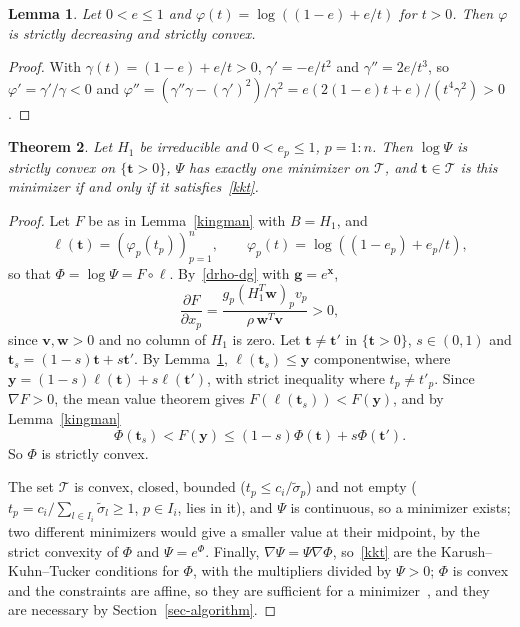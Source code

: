 \documentclass[11pt]{article}
\theoremstyle{plain}
\newtheorem{theorem}{Theorem}[section]
\newtheorem{lemma}[theorem]{Lemma}
\theoremstyle{remark}
\numberwithin{equation}{section}
\begin{document}
\begin{lemma}\label{log-g}
Let $0<e\le 1$ and $\varphi(t)=\log\left((1-e)+e/t\right)$ for $t>0$. Then
$\varphi$ is strictly decreasing and strictly convex.
\end{lemma}
\begin{proof}
With $\gamma(t)=(1-e)+e/t>0$, $\gamma'=-e/t^2$ and $\gamma''=2e/t^3$, so
$\varphi'=\gamma'/\gamma<0$ and
$\varphi''=\left(\gamma''\gamma-(\gamma')^2\right)/\gamma^2
=e\left(2(1-e)t+e\right)/\left(t^4\gamma^2\right)>0$.
\end{proof}

\begin{theorem}\label{thm-unique}
Let $H_1$ be irreducible and $0<e_p\le 1$, $p=1:n$. Then $\log\Psi$ is strictly
convex on $\{\bm t>0\}$, $\Psi$ has exactly one minimizer on $\mathcal{T}$, and
$\bm t\in\mathcal{T}$ is this minimizer if and only if it satisfies~\eqref{kkt}.
\end{theorem}
\begin{proof}
Let $F$ be as in Lemma~\ref{kingman} with $B=H_1$, and
\begin{equation*}
\bm\ell(\bm t)=\left(\varphi_p(t_p)\right)_{p=1}^n,\qquad
\varphi_p(t)=\log\left((1-e_p)+e_p/t\right),
\end{equation*}
so that $\Phi=\log\Psi=F\circ\bm\ell$. By~\eqref{drho-dg} with $\bm g=e^{\bm x}$,
\begin{equation*}
\frac{\partial F}{\partial x_p}=\frac{g_p\left(H_1^T\bm w\right)_pv_p}{\rho\,\bm w^T\bm v}>0,
\end{equation*}
since $\bm v,\bm w>0$ and no column of $H_1$ is zero. Let $\bm t\ne\bm t'$ in
$\{\bm t>0\}$, $s\in(0,1)$ and $\bm t_s=(1-s)\bm t+s\bm t'$. By
Lemma~\ref{log-g}, $\bm\ell(\bm t_s)\le\bm y$ componentwise, where
$\bm y=(1-s)\bm\ell(\bm t)+s\bm\ell(\bm t')$, with strict inequality where
$t_p\ne t'_p$. Since $\nabla F>0$, the mean value theorem gives
$F\left(\bm\ell(\bm t_s)\right)<F(\bm y)$, and by Lemma~\ref{kingman}
\begin{equation*}
\Phi(\bm t_s)<F(\bm y)\le(1-s)\Phi(\bm t)+s\Phi(\bm t').
\end{equation*}
So $\Phi$ is strictly convex.

The set $\mathcal{T}$ is convex, closed, bounded ($t_p\le c_i/\widetilde\sigma_p$)
and not empty ($t_p=c_i/\sum_{l\in I_i}\widetilde\sigma_l\ge 1$, $p\in I_i$, lies in it),
and $\Psi$ is continuous, so a minimizer exists; two different minimizers
would give a smaller value at their midpoint, by the strict convexity of
$\Phi$ and $\Psi=e^\Phi$. Finally, $\nabla\Psi=\Psi\nabla\Phi$, so~\eqref{kkt}
are the Karush--Kuhn--Tucker conditions for $\Phi$, with the multipliers divided
by $\Psi>0$; $\Phi$ is convex and the constraints are affine, so they are
sufficient for a minimizer~\cite[Section~5.5.3]{2004Boyd_Vandenberghe}, and they
are necessary by Section~\ref{sec-algorithm}.
\end{proof}
\end{document}
